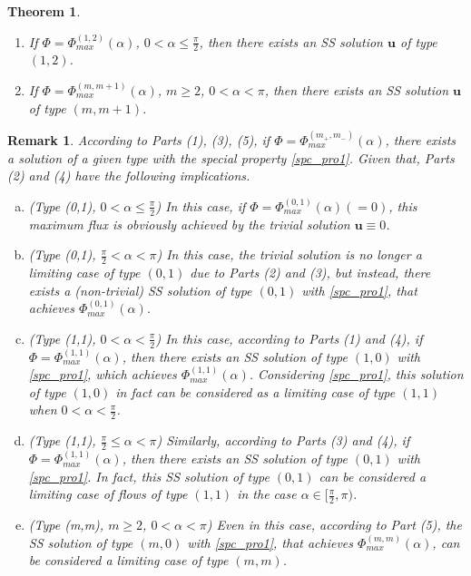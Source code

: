 \documentclass[reqno,12pt]{amsart}
\newtheorem{theorem}{Theorem}[section]
\newtheorem{remark}{Remark}[section]
\newcommand{\Bu}{{\boldsymbol{u}}}
\begin{document}
\begin{theorem}
\begin{enumerate}
            \item If $\Phi = \Phi_{max}^{(1,2)}(\alpha)$, $0< \alpha \leq \frac{\pi}{2}$, then there exists an SS solution $\Bu$ of type $(1, 2)$.

            \item If $\Phi = \Phi_{max}^{(m,m+1)}(\alpha)$, $m\geq 2$, $0< \alpha < \pi $, then there exists an SS solution $\Bu$ of type $(m, m+1)$.
        \end{enumerate}
\end{theorem}


\begin{remark}
According to Parts (1), (3), (5), if $\Phi=\Phi^{(m_+,m_-)}_{max}(\alpha)$, there exists a solution of a given type with the special property \eqref{spc_pro1}. Given that, Parts (2) and (4) have the following implications.
    \begin{enumerate}[(a)]
        \item (Type (0,1), $0<\alpha \leq \frac{\pi}{2}$) In this case, if $\Phi=\Phi^{(0,1)}_{max}(\alpha)(=0)$, this maximum flux is obviously achieved by the trivial solution $\Bu\equiv 0$. %
        
        \item  (Type (0,1), $\frac{\pi}{2}<\alpha <\pi$) In this case, the trivial solution is no longer a limiting case of type $(0,1)$ due to Parts (2) and (3), but instead, there exists a (non-trivial) SS solution of type $(0,1)$ with  \eqref{spc_pro1}, that achieves $\Phi^{(0,1)}_{max}(\alpha)$.

        \item (Type (1,1), $0<\alpha<\frac{\pi}{2}$)  In this case, according to Parts (1) and  (4), if $\Phi=\Phi^{(1,1)}_{max}(\alpha)$, then there exists an SS solution of type $(1,0)$ with  \eqref{spc_pro1}, which achieves $\Phi^{(1,1)}_{max}(\alpha)$. Considering \eqref{spc_pro1}, this solution of type $(1,0)$ in fact can be considered as a limiting case of type $(1,1)$  when $0<\alpha<\frac{\pi}{2}$.

        \item (Type (1,1), $\frac{\pi}{2}\leq \alpha <\pi$) Similarly, according to Parts (3) and (4), 
        if $\Phi=\Phi^{(1,1)}_{max}(\alpha)$, then there exists an SS solution of type $(0,1)$ with  \eqref{spc_pro1}. In fact, this SS solution of type $(0,1)$ can be considered a limiting case of flows of type $(1,1)$  in the case $\alpha \in [\frac{\pi}{2}, \pi)$.

        \item (Type (m,m), $m\geq 2$, $0<\alpha <\pi$) Even in this case, according to Part (5), the SS solution of type $(m,0)$ with \eqref{spc_pro1}, that achieves $\Phi^{(m,m)}_{max}(\alpha)$, can be considered a limiting case of type $(m,m)$.
    \end{enumerate}
\end{remark}
\end{document}
